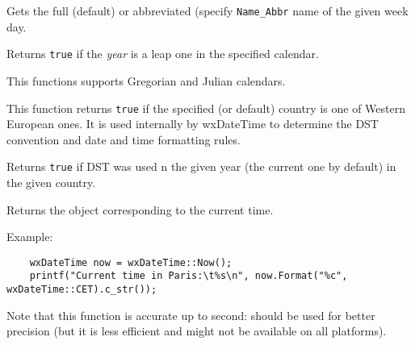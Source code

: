 \label{wxdatetimegetweekdayname}


Gets the full (default) or abbreviated (specify {\tt Name\_Abbr} name of the
given week day.




\label{wxdatetimeisleapyear}


Returns {\tt true} if the {\it year} is a leap one in the specified calendar.

This functions supports Gregorian and Julian calendars.


\label{wxdatetimeiswesteuropeancountry}


This function returns {\tt true} if the specified (or default) country is one
of Western European ones. It is used internally by wxDateTime to determine the
DST convention and date and time formatting rules.


\label{wxdatetimeisdstapplicable}


Returns {\tt true} if DST was used n the given year (the current one by
default) in the given country.


\label{wxdatetimenow}


Returns the object corresponding to the current time.

Example:

\begin{verbatim}
    wxDateTime now = wxDateTime::Now();
    printf("Current time in Paris:\t%s\n", now.Format("%c", wxDateTime::CET).c_str());
\end{verbatim}

Note that this function is accurate up to second:
 should be used for better precision
(but it is less efficient and might not be available on all platforms).

